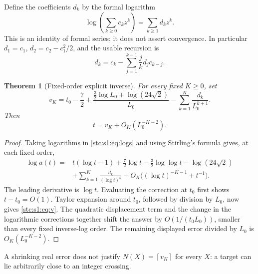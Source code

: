 \documentclass[11pt,letterpaper]{article}
\numberwithin{equation}{section}
\newtheorem{theorem}{Theorem}[section]
\theoremstyle{remark}\newtheorem{remark}[theorem]{Remark}
\newcommand{\ceil}[1]{\left\lceil #1\right\rceil}
\begin{document}
Define the coefficients $d_k$ by the formal logarithm
\begin{equation}\label{stc:s1:eq:d}
 \log\left(\sum_{k\geq0}c_k z^k\right)=\sum_{k\geq1}d_kz^k.
\end{equation}
This is an identity of formal series; it does not assert convergence. In particular $d_1=c_1$, $d_2=c_2-c_1^2/2$, and the usable recursion is
\[
 d_k=c_k-\sum_{j=1}^{k-1}\frac jk d_jc_{k-j}.
\]
\begin{theorem}[Fixed-order explicit inverse]\label{stc:s1:th:inverse}
For every fixed $K\geq0$, set
\begin{equation}\label{stc:s1:eq:v}
 v_K=t_0-\frac72+
 \frac{\tfrac32\log L_0+\log(24\sqrt2)}{L_0}
 -\sum_{k=1}^K\frac{d_k}{L_0^{k+1}}.
\end{equation}
Then
\begin{equation}\label{stc:s1:eq:vinverse}
 t=v_K+O_K(L_0^{-K-2}).
\end{equation}
\end{theorem}
\begin{proof}
Taking logarithms in \eqref{stc:s1:eq:logs} and using Stirling's formula gives, at each fixed order,
\begin{align}\label{stc:s1:eq:loga}
 \log a(t)={}&t(\log t-1)+\frac72\log t-\frac32\log\log t
 -\log(24\sqrt2)\nonumber\\
 &+\sum_{k=1}^K\frac{d_k}{(\log t)^k}
 +O_K\bigl((\log t)^{-K-1}+t^{-1}\bigr).
\end{align}
The leading derivative is $\log t$. Evaluating the correction at $t_0$ first shows $t-t_0=O(1)$. Taylor expansion around $t_0$, followed by division by $L_0$, now gives \eqref{stc:s1:eq:v}. The quadratic displacement term and the change in the logarithmic corrections together shift the answer by $O(1/(t_0L_0))$, smaller than every fixed inverse-log order. The remaining displayed error divided by $L_0$ is $O_K(L_0^{-K-2})$.
\end{proof}
A shrinking real error does not justify $N(X)=\ceil{v_K}$ for every $X$: a target can lie arbitrarily close to an integer crossing.
\end{document}
